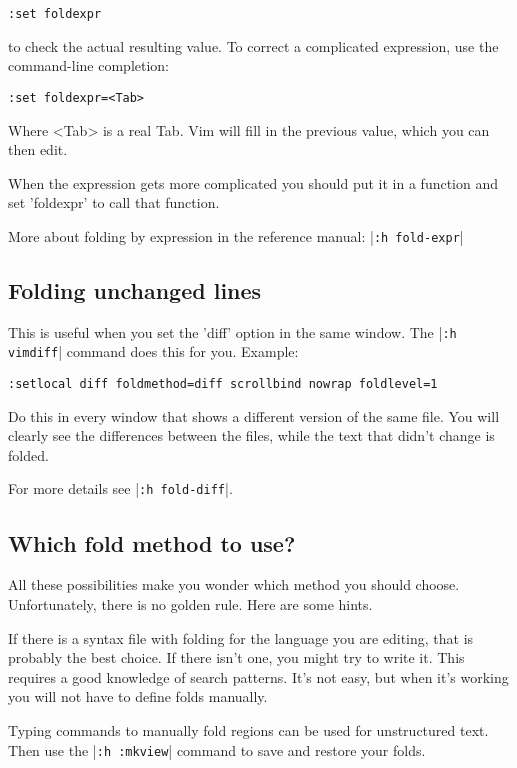 \begin{Verbatim}[samepage=true]
 :set foldexpr
\end{Verbatim}

to check the actual resulting value.
To correct a complicated expression, use the command-line completion:

\begin{Verbatim}[samepage=true]
 :set foldexpr=<Tab>
\end{Verbatim}

Where <Tab> is a real Tab.
Vim will fill in the previous value, which you can then edit.

When the expression gets more complicated you should put it in a function and set 'foldexpr' to call that function.

More about folding by expression in the reference manual: |\verb!:h fold-expr!|
\subsection{Folding unchanged lines}
This is useful when you set the 'diff' option in the same window.
The |\verb!:h vimdiff!| command does this for you.
Example:

\begin{Verbatim}[samepage=true]
 :setlocal diff foldmethod=diff scrollbind nowrap foldlevel=1
\end{Verbatim}

Do this in every window that shows a different version of the same file.
You will clearly see the differences between the files, while the text that didn't change is folded.

For more details see |\verb!:h fold-diff!|.
\subsection{Which fold method to use?}
All these possibilities make you wonder which method you should choose.
Unfortunately, there is no golden rule.
Here are some hints.

If there is a syntax file with folding for the language you are editing, that is probably the best choice.
If there isn't one, you might try to write it.
This requires a good knowledge of search patterns.
It's not easy, but when it's working you will not have to define folds manually.

Typing commands to manually fold regions can be used for unstructured text.
Then use the |\verb!:h :mkview!| command to save and restore your folds.


